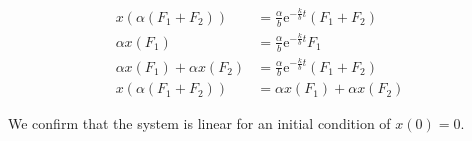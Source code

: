\begin{equation*}
 \begin{split}
  x(\alpha (F_1 + F_2)) & = \frac{\alpha}{b} 
\mathrm{e}^{-\frac{k}{b}t} (F_1 + F_2)\\
\alpha x(F_1) & = \frac{\alpha}{b} 
\mathrm{e}^{-\frac{k}{b}t} F_1\\
\alpha x(F_1) + \alpha x(F_2) & = \frac{\alpha}{b} 
\mathrm{e}^{-\frac{k}{b}t} (F_1 + F_2)\\
x(\alpha (F_1 + F_2)) & = \alpha x(F_1) + \alpha x(F_2)
 \end{split}
\end{equation*}

We confirm that the system is linear for an initial 
condition of $x(0)=0$.
